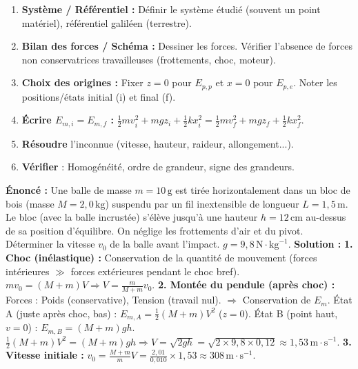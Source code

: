 \documentclass[11pt]{article}
\begin{document}
\begin{methode}
\begin{enumerate}
    \item \textbf{Système / Référentiel :} Définir le système étudié (souvent un point matériel), référentiel galiléen (terrestre).
    \item \textbf{Bilan des forces / Schéma :} Dessiner les forces. Vérifier l'absence de forces non conservatrices travailleuses (frottements, choc, moteur).
    \item \textbf{Choix des origines :} Fixer $z=0$ pour $E_{p,p}$ et $x=0$ pour $E_{p,e}$. Noter les positions/états initial (i) et final (f).
    \item \textbf{Écrire $E_{m,i} = E_{m,f}$ :} $\frac{1}{2}mv_i^2 + mgz_i + \frac{1}{2}kx_i^2 = \frac{1}{2}mv_f^2 + mgz_f + \frac{1}{2}kx_f^2$.
    \item \textbf{Résoudre} l'inconnue (vitesse, hauteur, raideur, allongement...).
    \item \textbf{Vérifier} : Homogénéité, ordre de grandeur, signe des grandeurs.
\end{enumerate}
\end{methode}

\begin{exoresolu}
\textbf{Énoncé :} Une balle de masse $m = 10\,\text{g}$ est tirée horizontalement dans un bloc de bois (masse $M = 2,0\,\text{kg}$) suspendu par un fil inextensible de longueur $L = 1,5\,\text{m}$. Le bloc (avec la balle incrustée) s'élève jusqu'à une hauteur $h = 12\,\text{cm}$ au-dessus de sa position d'équilibre. On néglige les frottements d'air et du pivot. Déterminer la vitesse $v_0$ de la balle avant l'impact. $g = 9,8\,\text{N}\!\cdot\!\text{kg}^{-1}$.
\tcblower
\textbf{Solution :}
\textbf{1. Choc (inélastique) :} Conservation de la quantité de mouvement (forces intérieures $\gg$ forces extérieures pendant le choc bref).
$m v_0 = (M+m) V \Rightarrow V = \frac{m}{M+m}v_0$.
\textbf{2. Montée du pendule (après choc) :} Forces : Poids (conservative), Tension (travail nul). $\Rightarrow$ Conservation de $E_m$.
État A (juste après choc, bas) : $E_{m,A} = \frac{1}{2}(M+m)V^2$ ($z=0$).
État B (point haut, $v=0$) : $E_{m,B} = (M+m)gh$.
$\frac{1}{2}(M+m)V^2 = (M+m)gh \Rightarrow V = \sqrt{2gh} = \sqrt{2 \times 9,8 \times 0,12} \approx 1,53\,\text{m}\!\cdot\!\text{s}^{-1}$.
\textbf{3. Vitesse initiale :} $v_0 = \frac{M+m}{m} V = \frac{2,01}{0,010} \times 1,53 \approx \boxed{308\,\text{m}\!\cdot\!\text{s}^{-1}}$.
\end{exoresolu}
\end{document}
